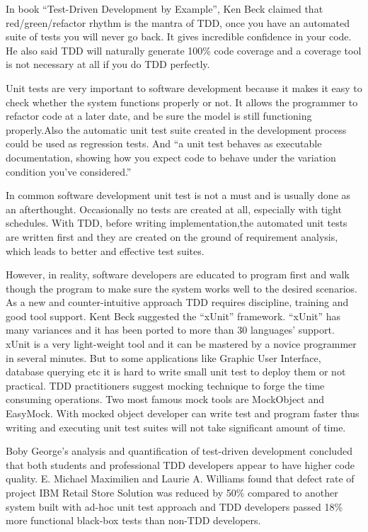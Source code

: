 In book ``Test-Driven Development by Example'', Ken Beck claimed that
red/green/refactor rhythm is the mantra of TDD, once you have an automated
suite of tests you will never go back. It gives incredible confidence in
your code. He also said TDD will naturally generate 100\% code coverage and a
coverage tool is not necessary at all if you do TDD perfectly.

Unit tests are very important to software development because it makes it
easy to check whether the system functions properly or not. It allows the
programmer to refactor code at a later date, and be sure the model is still
functioning properly\cite{UnitTest}.Also the automatic unit test suite created
in the development process could be used as regression tests. And ``a unit
test behaves as executable documentation, showing how you expect code to
behave under the variation condition you've considered.''\cite{Andy&Dave_2003}

In common software development unit test is not a must and is usually done
as an afterthought. Occasionally no tests are created at all, especially
with tight schedules. With TDD, before writing implementation,the automated
unit tests are written first and they are created on the ground of
requirement analysis, which leads to better and effective test suites.
  
However, in reality, software developers are educated to program first and
walk though the program to make sure the system works well to the desired
scenarios. As a new and counter-intuitive approach TDD requires discipline,
training and good tool support. Kent Beck suggested the ``xUnit''
framework. ``xUnit'' has many variances and it has been ported to more than
30 languages' support\cite{XPSoftware}. xUnit is a very light-weight tool
and it can be mastered by a novice programmer in several minutes. But to
some applications like Graphic User Interface, database querying etc it is
hard to write small unit test to deploy them or not practical. TDD
practitioners suggest mocking technique to forge the time consuming
operations. Two most famous mock tools are MockObject and EasyMock. With
mocked object developer can write test and program faster thus writing and
executing unit test suites will not take significant amount of time.

Boby George's analysis and quantification of test-driven development
concluded that both students and professional TDD developers appear to have
higher code quality\cite{George_2002}. E. Michael Maximilien and Laurie
A. Williams found that defect rate of project IBM Retail Store
Solution was reduced by 50\% compared to another system built with ad-hoc
unit test approach \cite{Maximilien_2003} and TDD developers passed 18\% more
functional black-box tests than non-TDD developers. 























